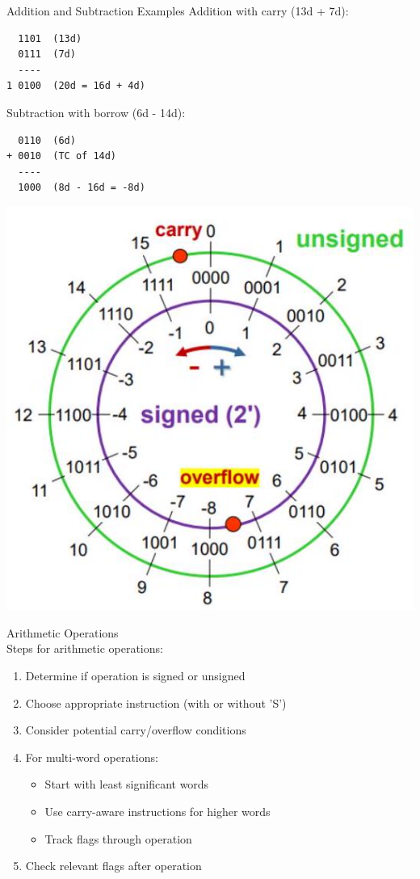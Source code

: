 \begin{example2}{Addition and Subtraction Examples}
Addition with carry (13d + 7d):
\begin{verbatim}
  1101  (13d)
  0111  (7d)
  ----
1 0100  (20d = 16d + 4d)
\end{verbatim}

Subtraction with borrow (6d - 14d):
\begin{verbatim}
  0110  (6d)
+ 0010  (TC of 14d)
  ----
  1000  (8d - 16d = -8d)
\end{verbatim}

\includegraphics[width=\linewidth]{images/2024_12_29_79e6b22f503fb7b4f718g-04(2)}
\end{example2}

\begin{KR}{Arithmetic Operations}\\
Steps for arithmetic operations:
\begin{enumerate}
  \item Determine if operation is signed or unsigned
  \item Choose appropriate instruction (with or without 'S')
  \item Consider potential carry/overflow conditions
  \item For multi-word operations:
    \begin{itemize}
      \item Start with least significant words
      \item Use carry-aware instructions for higher words
      \item Track flags through operation
    \end{itemize}
  \item Check relevant flags after operation
\end{enumerate}
\end{KR}

